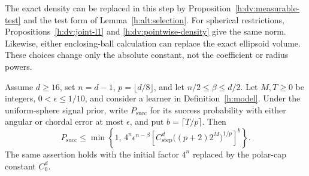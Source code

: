The exact density can be replaced in this step by
Proposition~\ref{h:dv:measurable-test} and the test form of
Lemma~\ref{h:alt:selection}. For spherical restrictions,
Propositions~\ref{h:dv:joint-l1} and \ref{h:dv:pointwise-density}
give the same norm. Likewise, either enclosing-ball calculation can
replace the exact ellipsoid volume. These choices change only the
absolute constant, not the coefficient or radius powers.

\begin{proposition}\label{h:ev:coefficient-success}
Assume \(d\ge16\), set \(n=d-1\), \(p=\lfloor d/8\rfloor\), and let
\(n/2\le\beta\le d/2\). Let \(M,T\ge0\) be integers,
\(0<\epsilon\le1/10\), and consider a learner in
Definition~\ref{h:model}. Under the uniform-sphere signal prior, write
\(P_{\mathrm{succ}}\) for its success probability with either angular
or chordal error at most \(\epsilon\), and put \(b=\lceil T/p\rceil\).
Then
\begin{equation}\label{h:ev:common-success}
 P_{\mathrm{succ}}\le
 \min\left\{1,\,
 4^n\epsilon^{n-\beta}
 \left[C_{\mathrm{step}}^d
       \bigl((p+2)2^M\bigr)^{1/p}\right]^b\right\}.
\end{equation}
The same assertion holds with the initial factor \(4^n\) replaced
by the polar-cap constant \(C_0^d\).
\end{proposition}

